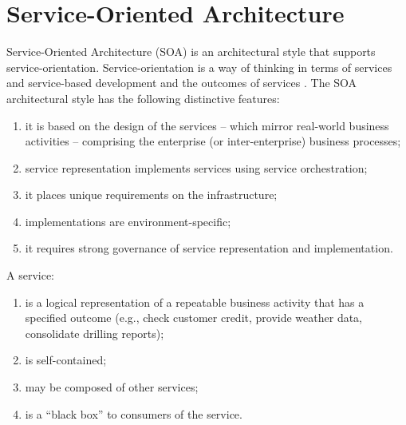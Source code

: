 \documentclass[\main/main.tex]{subfiles}
\begin{document}
\section{Service-Oriented Architecture}
Service-Oriented Architecture (SOA) is an architectural style that supports service-orientation. Service-orientation is a way of thinking in terms of services and service-based development and the outcomes of services \cite{soa_definition}. The SOA architectural style has the following distinctive features:
\begin{enumerate}
    \item it is based on the design of the services – which mirror real-world business activities – comprising the enterprise (or inter-enterprise) business processes;
    \item service representation implements services using service orchestration;
    \item it places unique requirements on the infrastructure;
    \item implementations are environment-specific;
    \item it requires strong governance of service representation and implementation.
\end{enumerate}
A service:
\begin{enumerate}
    \item is a logical representation of a repeatable business activity that has a specified outcome (e.g., check customer credit, provide weather data, consolidate drilling reports);
    \item is self-contained;
    \item may be composed of other services;
    \item is a “black box” to consumers of the service.
\end{enumerate}
\end{document}
